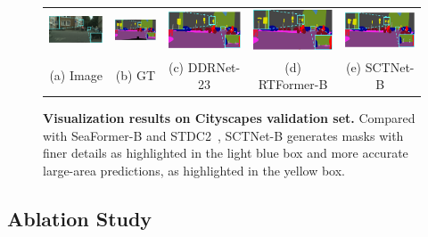 \documentclass[letterpaper]{article} %
\begin{document}
\begin{figure}[!t]
\begin{tabular}{ccccc}
  \includegraphics[width=0.19\linewidth]{image/figure6/3a.png}\label{3a} &
  \hspace{-12pt}
  \includegraphics[width=0.19\linewidth]{image/figure6/3b.png}\label{3b} &
  \hspace{-12pt}
  \includegraphics[width=0.19\linewidth]{image/figure6/3c.png}\label{3c} &
  \hspace{-12pt}
  \includegraphics[width=0.19\linewidth]{image/figure6/3d.png}\label{3d} &
  \hspace{-12pt}
  \includegraphics[width=0.19\linewidth]{image/figure6/3e.png}\label{3e} \\
  (a) Image & (b) GT & (c) DDRNet-23 & (d) RTFormer-B& (e) SCTNet-B\\
  \end{tabular}
  \caption{\textbf{Visualization results on Cityscapes validation set.} Compared with SeaFormer-B\cite{wan2023seaformer} and STDC2~\cite{fan2021rethinking}, SCTNet-B generates masks with finer details as highlighted in the light blue box and more accurate large-area predictions, as highlighted in the yellow box.
      }
  \label{fig:vis_cityscapes}
  
  \end{figure}
  
\subsection{Ablation Study}
\end{document}
